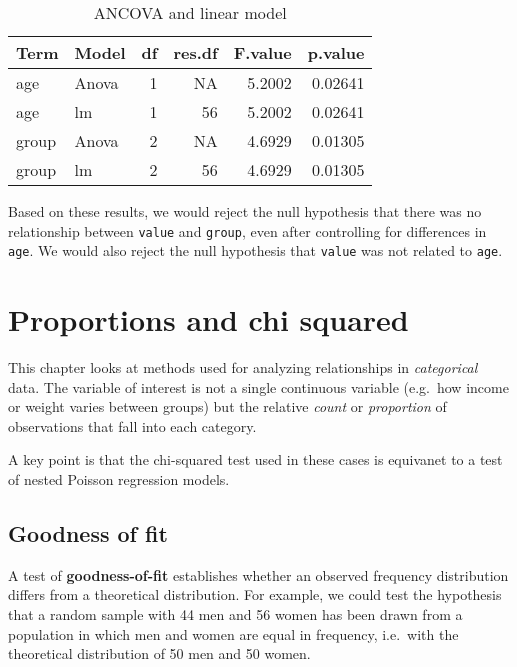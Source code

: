 \documentclass[
  12pt,
]{krantz}
\begin{document}
\begin{table}

\caption{\label{tab:unnamed-chunk-54}ANCOVA and linear model}
\centering
\begin{tabular}[t]{llrrrr}
\toprule
Term & Model & df & res.df & F.value & p.value\\
\midrule
age & Anova & 1 & NA & 5.2002 & 0.02641\\
age & lm & 1 & 56 & 5.2002 & 0.02641\\
group & Anova & 2 & NA & 4.6929 & 0.01305\\
group & lm & 2 & 56 & 4.6929 & 0.01305\\
\bottomrule
\end{tabular}
\end{table}

Based on these results, we would reject the null hypothesis that there was no relationship between \texttt{value} and \texttt{group}, even after controlling for differences in \texttt{age}. We would also reject the null hypothesis that \texttt{value} was not related to \texttt{age}.

\hypertarget{proportions-and-chi-squared}{%
\chapter{Proportions and chi squared}\label{proportions-and-chi-squared}}

This chapter looks at methods used for analyzing relationships in \emph{categorical} data. The variable of interest is not a single continuous variable (e.g.~how income or weight varies between groups) but the relative \emph{count} or \emph{proportion} of observations that fall into each category.

A key point is that the chi-squared test used in these cases is equivanet to a test of nested Poisson regression models.

\hypertarget{goodness-of-fit}{%
\section{Goodness of fit}\label{goodness-of-fit}}

A test of \textbf{goodness-of-fit} establishes whether an observed frequency distribution differs from a theoretical distribution. For example, we could test the hypothesis that a random sample with 44 men and 56 women has been drawn from a population in which men and women are equal in frequency, i.e.~with the theoretical distribution of 50 men and 50 women.
\end{document}

